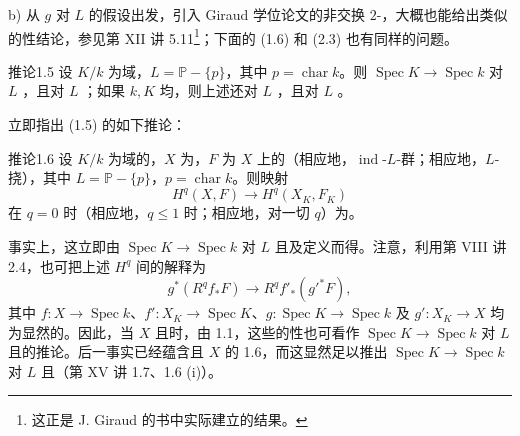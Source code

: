 b) 从 $g$ 对 $L$ 的假设出发，引入 Giraud 学位论文的非交换 $2$-，大概也能给出类似的性结论，参见第 XII 讲 5.11\footnote{这正是 J. Giraud 的书中实际建立的结果。}；下面的 (1.6) 和 (2.3) 也有同样的问题。
\begin{SGAresult}{推论}{1.5}
设 $K/k$ 为域，$L=\mathbb P-\{p\}$，其中 $p=\operatorname{char}k$。则 $\operatorname{Spec}K\to\operatorname{Spec}k$ 对 $L$ ，且对 $L$ ；如果 $k,K$ 均，则上述还对 $L$ ，且对 $L$ 。
\end{SGAresult}
立即指出 (1.5) 的如下推论：
\begin{SGAresult}{推论}{1.6}
设 $K/k$ 为域的，$X$ 为，$F$ 为 $X$ 上的（相应地，$\operatorname{ind}$-$L$-群；相应地，$L$-挠），其中 $L=\mathbb P-\{p\}$，$p=\operatorname{char}k$。则映射
\[
H^q(X,F)\longrightarrow H^q(X_K,F_K)
\]
在 $q=0$ 时（相应地，$q\leq1$ 时；相应地，对一切 $q$）为。
\end{SGAresult}
事实上，这立即由 $\operatorname{Spec}K\to\operatorname{Spec}k$ 对 $L$ 且及定义而得。注意，利用第 VIII 讲 2.4，也可把上述 $H^q$ 间的解释为
\[
g^*(R^qf_*F)\longrightarrow R^qf'_*(g'^*F),
\]
其中 $f:X\to\operatorname{Spec}k$、$f':X_K\to\operatorname{Spec}K$、$g:\operatorname{Spec}K\to\operatorname{Spec}k$ 及 $g':X_K\to X$ 均为显然的。因此，当 $X$ 且时，由 1.1，这些的性也可看作 $\operatorname{Spec}K\to\operatorname{Spec}k$ 对 $L$ 且的推论。后一事实已经蕴含且 $X$ 的 1.6，而这显然足以推出 $\operatorname{Spec}K\to\operatorname{Spec}k$ 对 $L$ 且（第 XV 讲 1.7、1.6 (i)）。

